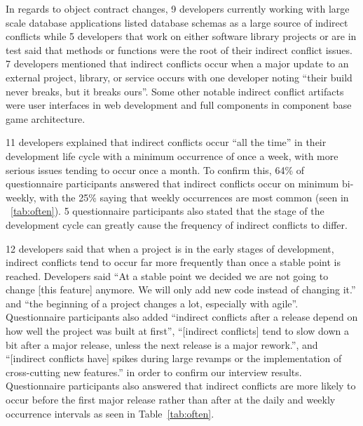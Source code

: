 In regards to object contract changes, 9 developers currently working with large scale database applications listed database
schemas as a large source of indirect conflicts while 5 developers that work on either software
library projects or are in test said that methods or functions were the root of their indirect conflict issues.
7 developers mentioned that indirect conflicts occur when a major update to an external project,
library, or service occurs with one developer noting ``their build never breaks, but it breaks ours''. Some
other notable indirect conflict artifacts were user interfaces in web development and full components in component
base game architecture.

11 developers explained that indirect conflicts occur ``all the time'' in
their development life cycle with a minimum occurrence of once a week, with more serious issues tending
to occur once a month. To confirm this, 64\% of questionnaire participants answered that indirect conflicts occur on minimum bi-weekly,
with the 25\% saying that weekly occurrences are most common (seen in ~\ref{tab:often}). 5 questionnaire participants
also stated that the stage of the development cycle can greatly cause the frequency of indirect conflicts to
differ.

12 developers said that
when a project is in the early stages of development, indirect conflicts tend to occur far more frequently
than once a stable point is reached. Developers said ``At a stable point we decided we are not going to change
[this feature] anymore. We will only add new code instead of changing it.'' and ``the beginning of a project
changes a lot, especially with agile''. Questionnaire participants also added ``indirect conflicts after a release
depend on how well the project was built at first'', ``[indirect conflicts] tend to slow down a bit after a
major release, unless the next release is a major rework.'', and ``[indirect conflicts have] spikes during
large revamps or the implementation of cross-cutting new features.'' in order to confirm our interview results.
Questionnaire participants also answered that
indirect conflicts are more likely to occur before the first major release rather than after at the daily
and weekly occurrence intervals as seen in Table~\ref{tab:often}.

